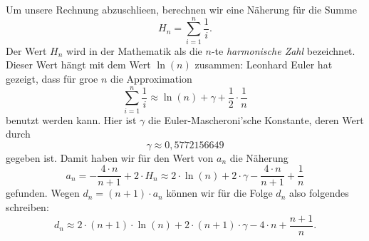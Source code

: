 Um unsere Rechnung abzuschlie\3en, berechnen wir eine N\"aherung f\"ur die Summe 
\[ H_n = \sum\limits_{i=1}^{n}\frac{1}{i}.\]
Der Wert $H_n$ wird in der Mathematik als die $n$-te \emph{harmonische Zahl} bezeichnet.
Dieser Wert h\"angt mit dem Wert $\ln(n)$ zusammen: Leonhard Euler hat gezeigt, dass f\"ur
gro\3e $n$ die Approximation
\[ \sum\limits_{i=1}^n \frac{1}{i} \approx \ln(n) + \gamma + \frac{1}{2} \cdot \frac{1}{n} \]
benutzt werden kann.  Hier ist $\gamma$ die Euler-Mascheroni'sche Konstante, deren Wert durch
\[ \gamma \approx 0,5772156649 \]
gegeben ist.  Damit haben wir f\"ur den Wert von $a_n$ die N\"aherung
\[ a_n = - \frac{4 \cdot n}{n+1} + 2 \cdot H_n \approx  
         2 \cdot \ln(n) + 2 \cdot \gamma - \frac{4 \cdot n}{n+1} + \frac{1}{n} 
\]
gefunden. Wegen $d_n = (n+1) \cdot a_n$ k\"onnen wir f\"ur die Folge $d_n$ also folgendes schreiben:
\[ d_n \approx  
       2 \cdot (n + 1) \cdot \ln(n) + 2 \cdot (n+1) \cdot \gamma - 4 \cdot n + \frac{n+1}{n}.
\]
\vspace*{0.3cm}


